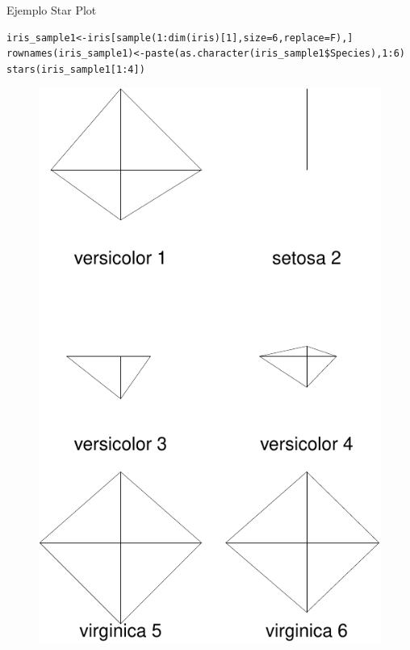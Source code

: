 \documentclass[handout]{beamer}
\begin{document}
\begin{frame}[fragile]{Ejemplo Star Plot}
\scriptsize{
\begin{verbatim}
iris_sample1<-iris[sample(1:dim(iris)[1],size=6,replace=F),]
rownames(iris_sample1)<-paste(as.character(iris_sample1$Species),1:6)
stars(iris_sample1[1:4]) 
\end{verbatim}

  \begin{figure}[h!]
	\centering
	\includegraphics[scale=0.4]{imagenes/star.pdf}		
\end{figure}   




}
 
\end{frame}
\end{document}
